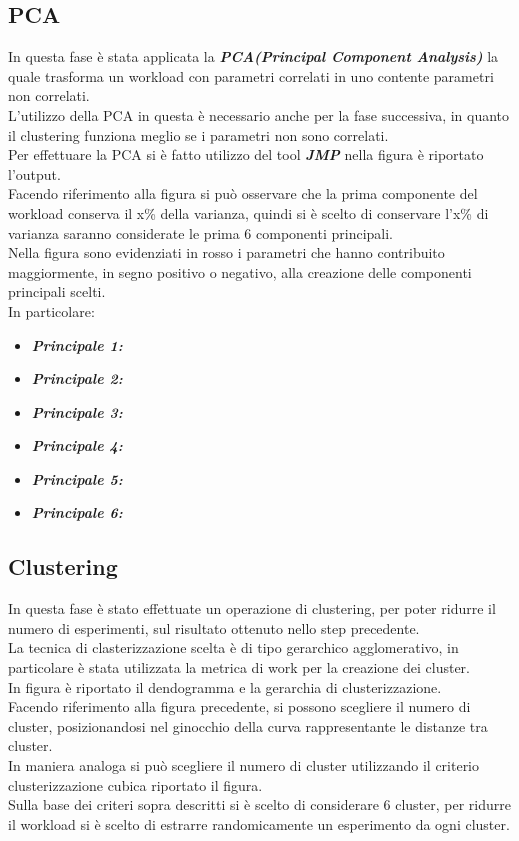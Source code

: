 \subsection{PCA}
In questa fase è stata applicata la
\textbf{\textit{PCA(Principal Component Analysis)}}
la quale trasforma un workload con parametri correlati in uno contente parametri
non correlati.\\
L'utilizzo della PCA in questa è necessario anche per la fase successiva, in quanto
il clustering funziona meglio se i parametri non sono correlati.\\
Per effettuare la PCA si è fatto utilizzo del tool \textit{\textbf{JMP}} nella
figura è riportato l'output.\\
Facendo riferimento alla figura si può osservare che la prima componente del workload
conserva il x\% della varianza, quindi si è scelto di conservare l'x\% di varianza
saranno considerate le prima 6 componenti principali.\\
Nella figura sono evidenziati in rosso i parametri che hanno contribuito maggiormente,
in segno positivo o negativo, alla creazione delle componenti principali scelti.\\
In particolare:
\begin{itemize}
  \item \textbf{\textit{Principale 1:}}
  \item \textbf{\textit{Principale 2:}}
  \item \textbf{\textit{Principale 3:}}
  \item \textbf{\textit{Principale 4:}}
  \item \textbf{\textit{Principale 5:}}
  \item \textbf{\textit{Principale 6:}}
\end{itemize}

\subsection{Clustering}
In questa fase è stato effettuate un operazione di clustering, per poter ridurre
il numero di esperimenti, sul risultato ottenuto nello step precedente.\\
La tecnica di clasterizzazione scelta è di tipo gerarchico agglomerativo, in particolare
è stata utilizzata la metrica di work  per la creazione dei cluster.\\
In figura è riportato il dendogramma e la gerarchia di clusterizzazione.\\
Facendo riferimento alla figura precedente, si possono scegliere il numero di cluster,
posizionandosi nel ginocchio della curva rappresentante le distanze tra cluster.\\
In maniera analoga si può scegliere il numero di cluster utilizzando il criterio
clusterizzazione cubica riportato il figura.\\
Sulla base dei criteri sopra descritti si è scelto di considerare 6 cluster, per
ridurre il workload si è scelto di estrarre randomicamente un esperimento da ogni cluster.
